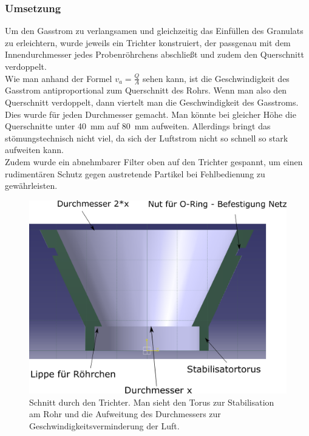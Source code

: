 \subsubsection{Umsetzung}

Um den Gasstrom zu verlangsamen und gleichzeitig das Einfüllen des Granulats zu erleichtern, wurde jeweils ein Trichter konstruiert, der passgenau mit dem Innendurchmesser jedes Probenröhrchens abschließt und zudem den Querschnitt verdoppelt. \\
Wie man anhand der Formel $v_a = \frac{Q}{A}$ \cite{Grollius2012} sehen kann, ist die Geschwindigkeit des Gasstrom antiproportional zum Querschnitt des Rohrs. Wenn man also den Querschnitt verdoppelt, dann viertelt man die Geschwindigkeit des Gasstroms. Dies wurde für jeden Durchmesser gemacht. Man könnte bei gleicher Höhe die Querschnitte unter \SI{40}{mm} auf \SI{80}{mm} aufweiten. Allerdings bringt das stömungstechnisch nicht viel, da sich der Luftstrom nicht so schnell so stark aufweiten kann. \\
Zudem wurde ein abnehmbarer Filter oben auf den Trichter gespannt, um einen rudimentären Schutz gegen austretende Partikel bei Fehlbedienung zu gewährleisten.

\begin{figure}[h!]
	\begin{center}
		\includegraphics[scale=0.4]{Schnitt_Trichter.png}
		\caption[Skizze Trichter]{Schnitt durch den Trichter. Man sieht den Torus zur Stabilisation am Rohr und die Aufweitung des Durchmessers zur Geschwindigkeitsverminderung der Luft.}
	\end{center}
\end{figure}


